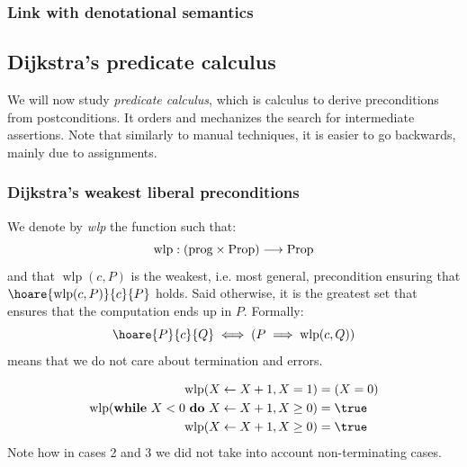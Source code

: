 \documentclass[toc]{../cs-classes/cs-classes}
\DeclareMathOperator{\wlp}{wlp}
\begin{document}
\subsubsection{Link with denotational semantics}

\subsection{Dijkstra's predicate calculus}
We will now study \emph{predicate calculus}, which is calculus to derive preconditions from postconditions. It orders and mechanizes the search for intermediate assertions. Note that similarly to manual techniques, it is easier to go backwards, mainly due to assignments.

\subsubsection{Dijkstra's weakest liberal preconditions}
\begin{definition}
    We denote by \emph{wlp} the function such that:
    \begin{equation*}
        \wlp: (\textnormal{prog} \times \textnormal{Prop}) \longrightarrow \textnormal{Prop}
    \end{equation*}
    and that $\wlp(c, P)$ is the weakest, i.e. most general, precondition ensuring that $\hoare{\wlp(c, P)}{c}{P}$ holds. Said otherwise, it is the greatest set that ensures that the computation ends up in $P$. Formally:
    \begin{equation*}
        \hoare{P}{c}{Q} \iff (P\implies\wlp(c, Q))
    \end{equation*}
     means that we do not care about termination and errors.
\end{definition}

\begin{example}
    \begin{equation*}
        \begin{aligned}
            \wlp(X\leftarrow X+1, X=1) &= (X=0)\\
            \wlp(\textnormal{\textbf{while} $X<0$ \textbf{do} $X\leftarrow X+1$}, X\geq0) &= \true\\
            \wlp(X\leftarrow X+1, X\geq0) &= \true\\
        \end{aligned}
    \end{equation*}
    Note how in cases 2 and 3 we did not take into account non-terminating cases.
\end{example}
\end{document}

